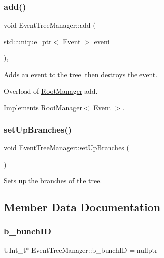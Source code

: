 \subsubsection{\texorpdfstring{add()}{add()}}
{\footnotesize\ttfamily void Event\+Tree\+Manager\+::add (\begin{DoxyParamCaption}\item[{std\+::unique\+\_\+ptr$<$ \hyperlink{class_event}{Event} $>$}]{event }\end{DoxyParamCaption})\hspace{0.3cm}{\ttfamily [final]}, {\ttfamily [virtual]}}



Adds an event to the tree, then destroys the event. 

Overload of \hyperlink{class_root_manager}{Root\+Manager} add. 

Implements \hyperlink{class_root_manager_a2f05eb45d5eaee1f9f12e299395652fb}{Root\+Manager$<$ Event $>$}.

\mbox{\label{class_event_tree_manager_a11cbe0078aeb3d0fe320bbeec335babc}} 
\subsubsection{\texorpdfstring{set\+Up\+Branches()}{setUpBranches()}}
{\footnotesize\ttfamily void Event\+Tree\+Manager\+::set\+Up\+Branches (\begin{DoxyParamCaption}{ }\end{DoxyParamCaption})\hspace{0.3cm}{\ttfamily [private]}}



Sets up the branches of the tree. 



\subsection{Member Data Documentation}
\mbox{\label{class_event_tree_manager_a4953fdf79783fdd5c0b867af1dbd8f3d}} 
\subsubsection{\texorpdfstring{b\+\_\+bunch\+ID}{b\_bunchID}}
{\footnotesize\ttfamily U\+Int\+\_\+t$\ast$ Event\+Tree\+Manager\+::b\+\_\+bunch\+ID = nullptr\hspace{0.3cm}{\ttfamily [private]}}



